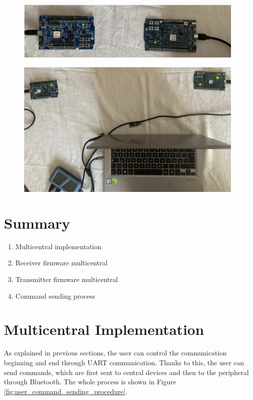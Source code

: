 \documentclass{Configuration_Files/PoliMi3i_thesis}
\begin{document}
\begin{figure}[h]
    \centering
    \includegraphics[scale=0.3]{Test_Procedure/20.png}
    \label{fig:boards_distance_10cm}
\end{figure}

\begin{figure}[h]
    \centering
    \includegraphics[scale=0.3]{Test_Procedure/21.png}
    \label{fig:boards_distance_50cm}
\end{figure}

\section*{Summary}
\begin{enumerate}
    \item Multicentral implementation 
    \item Receiver firmware multicentral 
    \item Transmitter firmware multicentral 
    \item Command sending process 
\end{enumerate}

\newpage
\section{Multicentral Implementation}
As explained in previous sections, the user can control the communication beginning and end through UART communication. Thanks to this, the user can send commands, which are first sent to central devices and then to the peripheral through Bluetooth. The whole process is shown in Figure \ref{fig:user_command_sending_procedure}.
\end{document}
